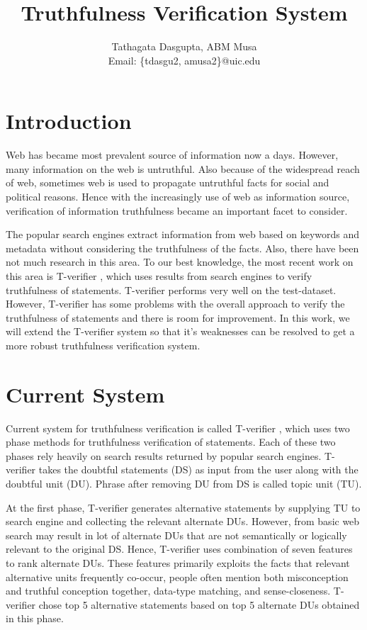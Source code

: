 \documentclass[11pt]{article}
\begin{document}
\title{Truthfulness Verification System}

\author{
Tathagata Dasgupta, ABM Musa\\
Email: \{tdasgu2, amusa2\}@uic.edu
}

\date{}
\maketitle


\section{Introduction}
Web has became most prevalent source of information now a days. However, many information on the web is untruthful. Also because of the widespread reach of web, sometimes web is used to propagate untruthful facts for social and political reasons. Hence with the increasingly use of web as information source, verification of information truthfulness became an important facet to consider. 

The popular search engines extract information from web based on keywords and metadata without considering the truthfulness of the facts. Also, there have been not much research in this area. To our best knowledge, the most recent work on this area is T-verifier  \cite{tverifier}, which uses results from search engines to verify truthfulness of statements. T-verifier performs very well on the test-dataset. However, T-verifier has some problems with the overall approach to verify the truthfulness of statements and there is room for improvement. In this work, we will extend the T-verifier system so that it's weaknesses can be resolved to get a more robust truthfulness verification system. 




\section{Current System}
Current system for truthfulness verification is called T-verifier \cite{tverifier}, which uses two phase methods for truthfulness verification of statements. Each of these two phases rely heavily on search results returned by popular search engines. T-verifier takes the doubtful statements (DS) as input from the user along with the doubtful unit (DU). Phrase after removing DU from DS is called topic unit (TU).

At the first phase, T-verifier generates alternative statements by supplying TU to search engine and collecting the relevant alternate DUs. However, from basic web search may result in lot of alternate DUs that are not semantically or logically relevant to the original DS. Hence, T-verifier uses combination of seven features to rank alternate DUs. These features primarily exploits the facts that relevant alternative units frequently co-occur, people often mention both misconception and truthful conception together, data-type matching, and sense-closeness. T-verifier chose top 5 alternative statements based on top 5 alternate DUs obtained in this phase. 
\end{document}
